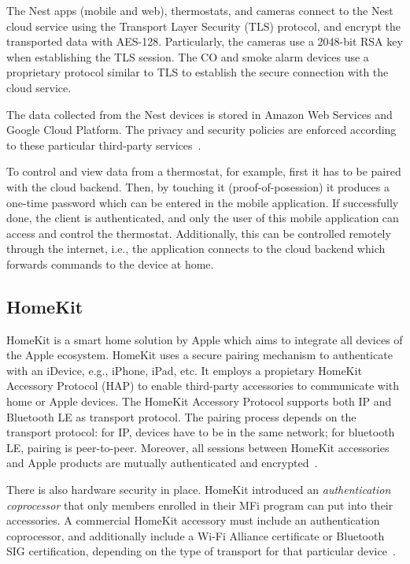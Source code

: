 \documentclass[12pt]{article}
\begin{document}
The Nest apps (mobile and web), thermostats, and cameras connect to the Nest cloud service using the Transport Layer Security (TLS) protocol, and encrypt the transported data with AES-128. Particularly, the cameras use a 2048-bit RSA key when establishing the TLS session. The CO and smoke alarm devices use a proprietary protocol similar to TLS to establish the secure connection with the cloud service.

The data collected from the Nest devices is stored in Amazon Web Services and Google Cloud Platform. The privacy and security policies are enforced according to these particular third-party services~\cite{related_01}.

To control and view data from a thermostat, for example, first it has to be paired with the cloud backend. Then, by touching it (proof-of-posession) it produces a one-time password which can be entered in the mobile application. If successfully done, the client is authenticated, and only the user of this mobile application can access and control the thermostat. Additionally, this can be controlled remotely through the internet, i.e., the application connects to the cloud backend which forwards commands to the device at home.

\subsection{HomeKit}

HomeKit is a smart home solution by Apple which aims to integrate all devices of the Apple ecosystem. HomeKit uses a secure pairing mechanism to authenticate with an iDevice, e.g., iPhone, iPad, etc. It employs a propietary HomeKit Accessory Protocol (HAP) to enable third-party accessories to communicate with home or Apple devices. The HomeKit Accessory Protocol supports both IP and Bluetooth LE as transport protocol. The pairing process depends on the transport protocol: for IP, devices have to be in the same network; for bluetooth LE, pairing is peer-to-peer. Moreover, all sessions between HomeKit accessories and Apple products are mutually authenticated and encrypted~\cite{related_02}.

There is also hardware security in place. HomeKit introduced an \emph{authentication coprocessor} that only members enrolled in their MFi program can put into their accessories. A commercial HomeKit accessory must include an authentication coprocessor, and additionally include a Wi-Fi Alliance certificate or Bluetooth SIG certification, depending on the type of transport for that particular device~\cite{related_02}.
\end{document}
